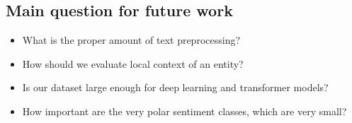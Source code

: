 \documentclass[11pt,a4paper]{article}
\begin{document}
\subsection{Main question for future work}
\begin{itemize}
  \item What is the proper amount of text preprocessing?
  \item How should we evaluate local context of an entity?
  \item Is our dataset large enough for deep learning and transformer models?
  \item How important are the very polar sentiment classes, which are very small?
\end{itemize}




\end{document}

